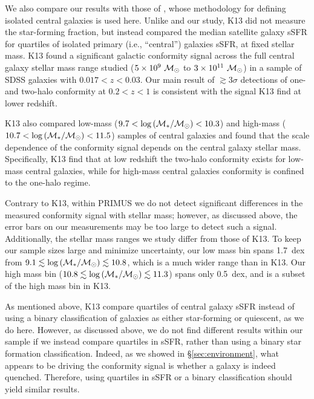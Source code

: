 
We also compare our results with those of \citet[][hereafter K13]{Kauffmann13}, whose methodology for defining isolated central galaxies is used here.
Unlike \citet{Weinmann06} and our study, K13 did not measure the star-forming fraction, but instead 
compared the median satellite galaxy sSFR for quartiles of isolated primary (i.e., ``central'') galaxies sSFR, at fixed stellar mass.
K13 found a significant galactic conformity signal across the full central 
galaxy stellar mass range studied (${5\times10^9~\msun}$ to ${3\times10^{11}~\msun}$) in a sample of 
SDSS galaxies with ${0.017 < z < 0.03}$.
Our main result of $\gtrsim3\sigma$ detections of one- and two-halo conformity at ${0.2<z<1}$ is consistent with the signal K13 find at lower redshift.

K13 also compared low-mass (${9.7 < \logM < 10.3}$) and high-mass (${10.7 < \logM < 11.5}$) samples of 
central galaxies and found that the scale dependence of the conformity signal depends on the central 
galaxy stellar mass.  Specifically, K13 find that at low redshift the two-halo conformity exists for 
low-mass central galaxies, while for high-mass central galaxies conformity is confined to the one-halo regime.

Contrary to K13, within PRIMUS we do not detect significant differences in the measured conformity 
signal with stellar mass;
however, as discussed above, the error bars on our measurements may be too large to detect such a signal.
Additionally, the stellar mass ranges we study differ from those of K13.
To keep our sample sizes large and minimize uncertainty, our low mass bin spans 1.7~dex from 
${9.1 \lesssim \logM \lesssim 10.8}$, which is a much wider range than in K13.
Our high mass bin (${10.8 \lesssim \logM \lesssim 11.3}$) spans only 0.5~dex, and is a subset of the high mass bin in K13.

As mentioned above, K13 compare quartiles of central galaxy sSFR instead of using a binary classification of galaxies 
as either star-forming or quiescent, as we do here.
However, as discussed above, we do not find different 
results within our sample if we instead compare quartiles in sSFR, rather than using a binary star formation classification.
Indeed, as we showed in \S\ref{sec:environment}, what appears to be driving the conformity signal is whether a galaxy is indeed quenched.
Therefore, using quartiles in sSFR or a binary classification should yield similar results.

